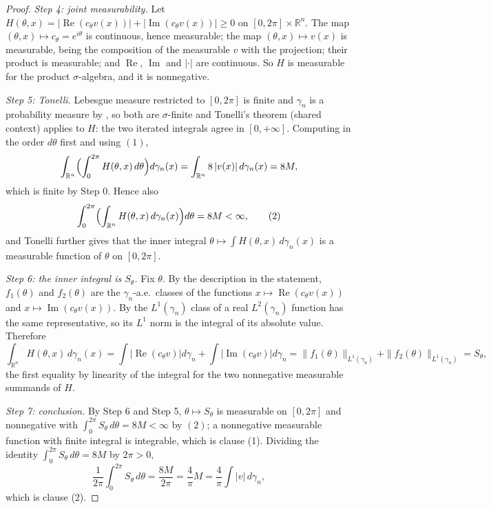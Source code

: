 \begin{proof}
\emph{Step 4: joint measurability.}
Let
$H(\theta, x) = \bigl|\operatorname{Re}(c_\theta v(x))\bigr|
  + \bigl|\operatorname{Im}(c_\theta v(x))\bigr| \geq 0$
on $[0,2\pi] \times \mathbb{R}^n$.  The map $(\theta,x)\mapsto c_\theta = e^{i\theta}$
is continuous, hence measurable; the map $(\theta,x)\mapsto v(x)$ is measurable,
being the composition of the measurable $v$ with the projection; their product is
measurable; and $\operatorname{Re}$, $\operatorname{Im}$ and $|\cdot|$ are
continuous.  So $H$ is measurable for the product $\sigma$-algebra, and it is
nonnegative.

\emph{Step 5: Tonelli.}
Lebesgue measure restricted to $[0,2\pi]$ is finite and $\gamma_n$ is a
probability measure by , so both are $\sigma$-finite and
Tonelli's theorem (shared context) applies to $H$: the two iterated integrals
agree in $[0,+\infty]$.  Computing in the order $d\theta$ first and using $(1)$,
\[
  \int_{\mathbb{R}^n}\Bigl(\int_0^{2\pi} H(\theta,x)\,d\theta\Bigr) d\gamma_n(x)
    = \int_{\mathbb{R}^n} 8\,|v(x)| \, d\gamma_n(x) = 8M ,
\]
which is finite by Step 0.  Hence also
\begin{equation*}
  \int_0^{2\pi}\Bigl(\int_{\mathbb{R}^n} H(\theta,x)\, d\gamma_n(x)\Bigr) d\theta
    = 8M < \infty , \tag{2}
\end{equation*}
and Tonelli further gives that the inner integral
$\theta \mapsto \int H(\theta,x)\,d\gamma_n(x)$ is a measurable function of
$\theta$ on $[0,2\pi]$.

\emph{Step 6: the inner integral is $S_\theta$.}
Fix $\theta$.  By the description in the statement, $f_1(\theta)$ and
$f_2(\theta)$ are the $\gamma_n$-a.e.\ classes of the functions
$x \mapsto \operatorname{Re}(c_\theta v(x))$ and
$x \mapsto \operatorname{Im}(c_\theta v(x))$.  By
 the $L^1(\gamma_n)$ class of a real $L^2(\gamma_n)$ function has
the same representative, so its $L^1$ norm is the integral of its absolute
value.  Therefore
\[
  \int_{\mathbb{R}^n} H(\theta,x)\,d\gamma_n(x)
    = \int\bigl|\operatorname{Re}(c_\theta v)\bigr| d\gamma_n
      + \int\bigl|\operatorname{Im}(c_\theta v)\bigr| d\gamma_n
    = \|f_1(\theta)\|_{L^1(\gamma_n)} + \|f_2(\theta)\|_{L^1(\gamma_n)}
    = S_\theta ,
\]
the first equality by linearity of the integral for the two nonnegative
measurable summands of $H$.

\emph{Step 7: conclusion.}
By Step 6 and Step 5, $\theta \mapsto S_\theta$ is measurable on $[0,2\pi]$ and
nonnegative with $\int_0^{2\pi} S_\theta\, d\theta = 8M < \infty$ by $(2)$; a
nonnegative measurable function with finite integral is integrable, which is
clause (1).  Dividing the identity $\int_0^{2\pi}S_\theta\,d\theta = 8M$ by
$2\pi > 0$,
\[
  \frac{1}{2\pi}\int_0^{2\pi} S_\theta\, d\theta = \frac{8M}{2\pi}
    = \frac{4}{\pi}M = \frac{4}{\pi}\int |v| \, d\gamma_n ,
\]
which is clause (2).
\end{proof}
